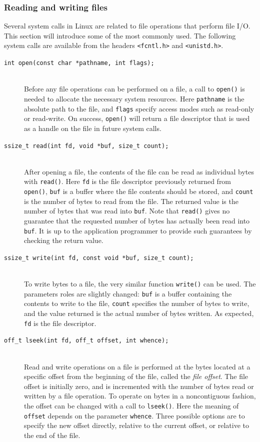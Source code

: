 \subsubsection{Reading and writing files}\label{sec:reading-and-writing-files}
Several system calls in Linux are related to file operations that perform file I/O. This section will introduce some of the most commonly used. The following system calls are available from the headers \texttt{<fcntl.h>} and \texttt{<unistd.h>}.

\begin{description}
\item[\texttt{int open(const char *pathname, int flags);}] \hfill \\
Before any file operations can be performed on a file, a call to \texttt{open()} is needed to allocate the necessary system resources. Here \texttt{pathname} is the absolute path to the file, and \texttt{flags} specify access modes such as read-only or read-write. On success, \texttt{open()} will return a file descriptor that is used as a handle on the file in future system calls.
\item[\texttt{ssize\_t read(int fd, void *buf, size\_t count);}] \hfill \\
After opening a file, the contents of the file can be read as individual bytes with \texttt{read()}. Here \texttt{fd} is the file descriptor previously returned from \texttt{open()}, \texttt{buf} is a buffer where the file contents should be stored, and \texttt{count} is the number of bytes to read from the file. The returned value is the number of bytes that was read into \texttt{buf}. Note that \texttt{read()} gives no guarantee that the requested number of bytes has actually been read into \texttt{buf}. It is up to the application programmer to provide such guarantees by checking the return value.
\item[\texttt{ssize\_t write(int fd, const void *buf, size\_t count);}] \hfill \\
To write bytes to a file, the very similar function \texttt{write()} can be used. The parameters roles are slightly changed: \texttt{buf} is a buffer containing the contents to write to the file, \texttt{count} specifies the number of bytes to write, and the value returned is the actual number of bytes written. As expected, \texttt{fd} is the file descriptor.
\item[\texttt{off\_t lseek(int fd, off\_t offset, int whence);}] \hfill \\
Read and write operations on a file is performed at the bytes located at a specific offset from the beginning of the file, called the \emph{file offset}. The file offset is initially zero, and is incremented with the number of bytes read or written by a file operation. To operate on bytes in a noncontiguous fashion, the offset can be changed with a call to \texttt{lseek()}. Here the meaning of \texttt{offset} depends on the parameter \texttt{whence}. Three possible options are to specify the new offset directly, relative to the current offset, or relative to the end of the file.

\end{description}
